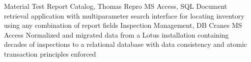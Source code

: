 %
%
%
%
%
\justifiedsubsection%
{Material Test Report Catalog, Thomas Repro}
{MS Access, SQL}
\workitemsOne%
{%
Document retrieval application with multiparameter search interface for locating inventory using any combination of report fields
}%
%
%
%
%
\justifiedsubsection%
{Inspection Management, DB Cranes}
{MS Access}
\workitemsOne%
{%
Normalized and migrated data from a Lotus installation containing decades of inspections to a relational database with data consistency and atomic transaction principles enforced
}%
%
%
%
%
%